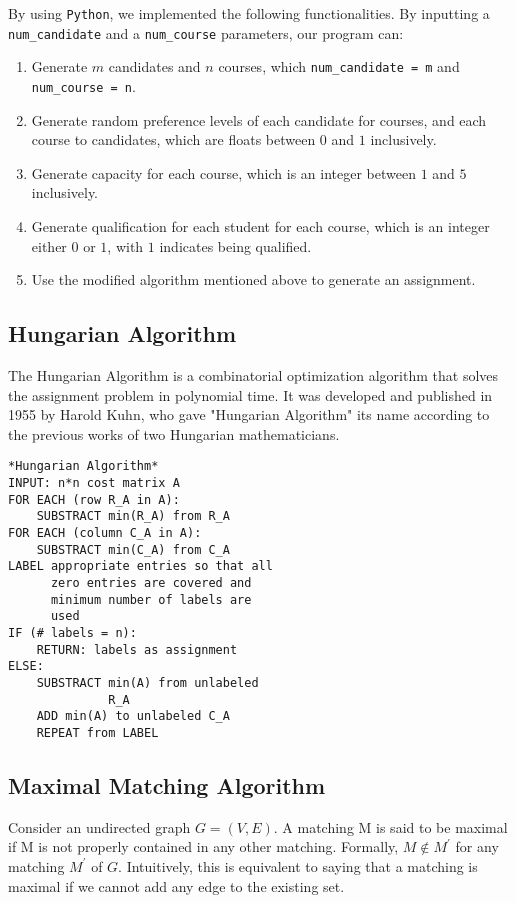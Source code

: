 \documentclass[twoside,twocolumn]{article}
\begin{document}
    By using \verb|Python|, we implemented the following functionalities. 
    By inputting a \verb|num_candidate| and a \verb|num_course| parameters, our program can:
    \begin{enumerate}
        \item Generate $m$ candidates and $n$ courses, which \verb|num_candidate = m| and \verb|num_course = n|.
        \item Generate random preference levels of each candidate for courses, and each course to candidates, which are
        floats between $0$ and $1$ inclusively.
        \item Generate capacity for each course, which is an integer between $1$ and $5$ inclusively.
        \item Generate qualification for each student for each course, which is an integer either $0$ or $1$, with $1$ indicates
        being qualified.
        \item Use the modified algorithm mentioned above to generate an assignment.
    \end{enumerate}

    \subsection{Hungarian Algorithm}
    The Hungarian Algorithm is a combinatorial optimization algorithm that solves the assignment problem in polynomial time.
    It was developed and published in 1955 by Harold Kuhn, who gave "Hungarian Algorithm" its name according to the previous works
    of two Hungarian mathematicians.
    \begin{lstlisting}
*Hungarian Algorithm*
INPUT: n*n cost matrix A
FOR EACH (row R_A in A):
    SUBSTRACT min(R_A) from R_A
FOR EACH (column C_A in A):
    SUBSTRACT min(C_A) from C_A
LABEL appropriate entries so that all
      zero entries are covered and 
      minimum number of labels are 
      used
IF (# labels = n):
    RETURN: labels as assignment    
ELSE:
    SUBSTRACT min(A) from unlabeled 
              R_A
    ADD min(A) to unlabeled C_A
    REPEAT from LABEL
    \end{lstlisting}

    \subsection{Maximal Matching Algorithm}
    Consider an undirected graph $G=(V,E)$. A matching M is said to be maximal if M is not properly contained in any other matching.
    Formally, $M\notin M^{'}$ for any matching $M^{'}$ of $G$. Intuitively, this is equivalent to saying that a matching is maximal 
    if we cannot add any edge to the existing set. 
\end{document}
